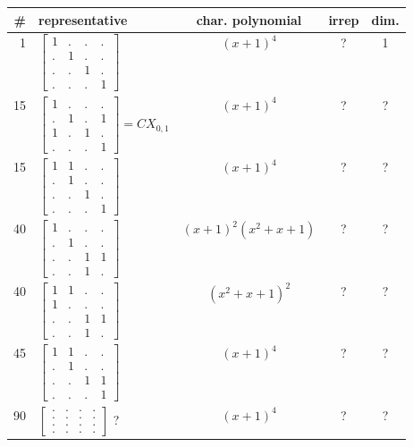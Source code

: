 \documentclass[11pt,oneside]{article}
\begin{document}
\begin{center}
\begin{tabular}{r|l|c|c|c}
\# & representative & char. polynomial & irrep & dim. \\
\hline
1  & $\begin{bmatrix}1&.&.&.\\.&1&.&.\\.&.&1&.\\.&.&.&1\end{bmatrix}$  & $(x+1)^4$  & ? & 1  \\
15  & $\begin{bmatrix}1&.&.&.\\.&1&.&1\\1&.&1&.\\.&.&.&1\end{bmatrix}=CX_{0,1}$
    & $(x+1)^4$  & ? & ?  \\
15  & $\begin{bmatrix}1&1&.&.\\.&1&.&.\\.&.&1&.\\.&.&.&1\end{bmatrix}$  & $(x+1)^4$  & ? & ?  \\
40  &  $\begin{bmatrix}1&.&.&.\\.&1&.&.\\.&.&1&1\\.&.&1&.\end{bmatrix}$   & $(x+1)^2(x^2+x+1)$  & ? & ?  \\
40  & $\begin{bmatrix}1&1&.&.\\1&.&.&.\\.&.&1&1\\.&.&1&.\end{bmatrix}$    & $(x^2+x+1)^2$  & ? & ?  \\
45  & $\begin{bmatrix}1&1&.&.\\.&1&.&.\\.&.&1&1\\.&.&.&1\end{bmatrix}$  & $(x+1)^4$  & ? & ?  \\
90  &  $\begin{bmatrix}.&.&.&.\\.&.&.&.\\.&.&.&.\\.&.&.&.\end{bmatrix}$ ?  & $(x+1)^4$  & ? & ?  \\

\end{tabular}
\end{center}
\end{document}
